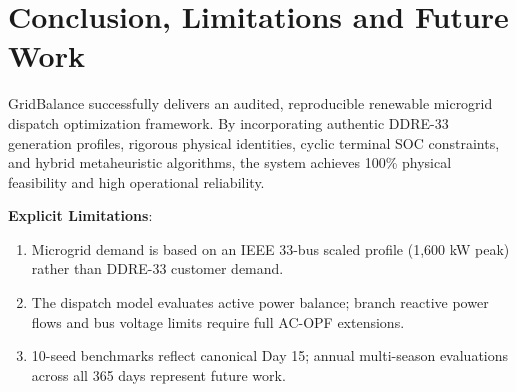 \documentclass[journal,10pt,twocolumn]{IEEEtran}
\begin{document}
\section{Conclusion, Limitations and Future Work}
GridBalance successfully delivers an audited, reproducible renewable microgrid dispatch optimization framework. By incorporating authentic DDRE-33 generation profiles, rigorous physical identities, cyclic terminal SOC constraints, and hybrid metaheuristic algorithms, the system achieves 100\% physical feasibility and high operational reliability.

\textbf{Explicit Limitations}:
\begin{enumerate}
    \item Microgrid demand is based on an IEEE 33-bus scaled profile (1,600 kW peak) rather than DDRE-33 customer demand.
    \item The dispatch model evaluates active power balance; branch reactive power flows and bus voltage limits require full AC-OPF extensions.
    \item 10-seed benchmarks reflect canonical Day 15; annual multi-season evaluations across all 365 days represent future work.
\end{enumerate}
\end{document}
